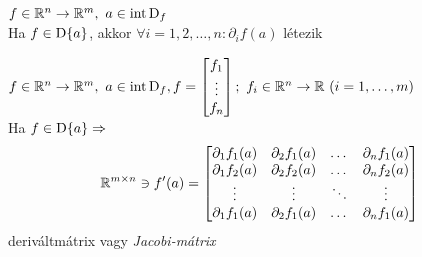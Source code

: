 \begin{te}
  $f\in\mathbb{R}^n\to\mathbb{R}^m,\ a\in\operatorname{int\,D}_f$\\
  Ha $f\in\operatorname{D}\{a\}$, akkor $\forall i=1,2,\dotsc,n\colon  \partial_if(a)$ létezik
\end{te}

\begin{te}
  $f\in\RnRm,\ a\in\intD_f,\\ f=\begin{bmatrix}f_1\\\vdots\\f_n\end{bmatrix};\ f_i\in\RnR\ (i=1,\dotsc,m)$\\
  \vspace{.1em}
  Ha $f\in\operatorname{D}\{a\}\Rightarrow\\$
  \[\mathbb{R}^{m\times n}\owns f'(a) = \begin{bmatrix}
    \partial_1 f_1(a) & \partial_2 f_1(a) & \dots & \partial_n f_1(a)\\
    \partial_1 f_2(a) & \partial_2 f_2(a) & \dots & \partial_n f_2(a)\\
    \vdots & \vdots & \ddots & \vdots \\
    \partial_1 f_1(a) & \partial_2 f_1(a) & \dots & \partial_n f_1(a)
    \end{bmatrix}\]
  deriváltmátrix vagy \emph{Jacobi-mátrix}
\end{te}

